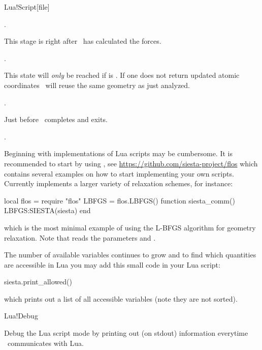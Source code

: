 \begin{fdfentry}{Lua!Script}[file]
\begin{fdfoptions}
    \note {}.

    \option[Forces]%
    This stage is right after \siesta\ has calculated the forces.

    \note {}.

    \option[Move]%
    This state will \emph{only} be reached if  is
    . If one does not return updated atomic coordinates
    \siesta\ will reuse the same geometry as just analyzed.

    \note {}.
    
    \option[Analysis]%
    Just before \siesta\ completes and exits. 

    \note {}.

  \end{fdfoptions}

  Beginning with implementations of Lua scripts may be cumbersome. It
  is recommended to start by using , see
  \url{https://github.com/siesta-project/flos} which contains several
  examples on how to start implementing your own scripts.
  Currently  implements a larger variety of relaxation
  schemes, for instance:
  \begin{codeexample}
    local flos = require "flos"
    LBFGS = flos.LBFGS()
    function siesta_comm()
       LBFGS:SIESTA(siesta)
    end
  \end{codeexample}
  which is the most minimal example of using the L-BFGS algorithm for
  geometry relaxation. Note that  reads the parameters
   and .

  \note The number of available variables continues to grow and to
  find which quantities are accessible in Lua you may add this small
  code in your Lua script:
  \begin{codeexample}
    siesta.print_allowed()
  \end{codeexample}
  which prints out a list of all accessible variables (note they are
  not sorted).
  
\end{fdfentry}

\begin{fdflogicalF}{Lua!Debug}

  Debug the Lua script mode by printing out (on stdout) information
  everytime \siesta\ communicates with Lua.
  
\end{fdflogicalF}

